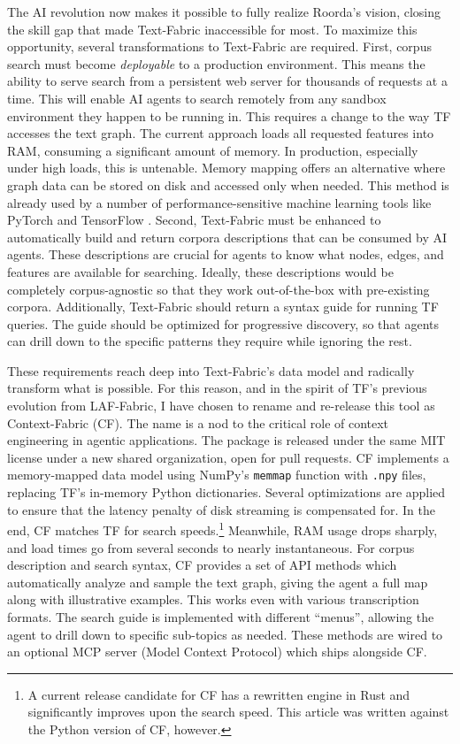 \documentclass[11pt,a4paper]{article}
\begin{document}
The AI revolution now makes it possible to fully realize Roorda's vision, closing the skill gap that made Text-Fabric
inaccessible for most. To maximize this opportunity, several transformations to Text-Fabric are required.
First, corpus search must become \textit{deployable} to a production environment. 
This means the ability to serve search from a persistent web server for
thousands of requests at a time. This will enable AI agents to search remotely from any sandbox environment
they happen to be running in. This requires a change to the way TF accesses the text graph. The current
approach loads all requested features into RAM, consuming a significant amount of memory. In production,
especially under high loads, this is untenable. Memory mapping offers an alternative where graph data can
be stored on disk and accessed only when needed. This method is already used
by a number of performance-sensitive machine learning tools like PyTorch and TensorFlow \cite{pytorchmmap,tensorflowmmap}.
Second, Text-Fabric must be enhanced to automatically build and return corpora descriptions that can
be consumed by AI agents. These descriptions are crucial for agents to know what nodes, edges, and features
are available for searching. Ideally, these descriptions would be completely corpus-agnostic so that they
work out-of-the-box with pre-existing corpora. Additionally, Text-Fabric should return a syntax guide
for running TF queries. The guide should be optimized for progressive discovery, so that agents can drill down
to the specific patterns they require while ignoring the rest.

These requirements reach deep into Text-Fabric's data model and radically transform what is possible.
For this reason, and in the spirit of TF's previous evolution from LAF-Fabric, I have chosen to rename
and re-release this tool as Context-Fabric (CF). The name is a nod to the critical role of context engineering
in agentic applications. The package is released under the same MIT license under a new shared organization,
open for pull requests. CF implements a memory-mapped data model using NumPy's \texttt{memmap} function with
\texttt{.npy} files, replacing TF's in-memory Python dictionaries. Several optimizations are applied to ensure
that the latency penalty of disk streaming is compensated for. In the end, CF matches TF for search speeds.\footnote{
    A current release candidate for CF has a rewritten engine in Rust and significantly improves upon the search speed.
    This article was written against the Python version of CF, however.
}
Meanwhile, RAM usage drops sharply, and load times go from several seconds to nearly instantaneous.
For corpus description and search syntax, CF provides a set of API methods which automatically analyze and sample
the text graph, giving the agent a full map along with illustrative examples. This works even with various transcription
formats. The search guide is implemented with different ``menus'', allowing the agent to drill down to specific
sub-topics as needed. These methods are wired to an optional MCP server (Model Context Protocol) which ships alongside
CF.
\end{document}
